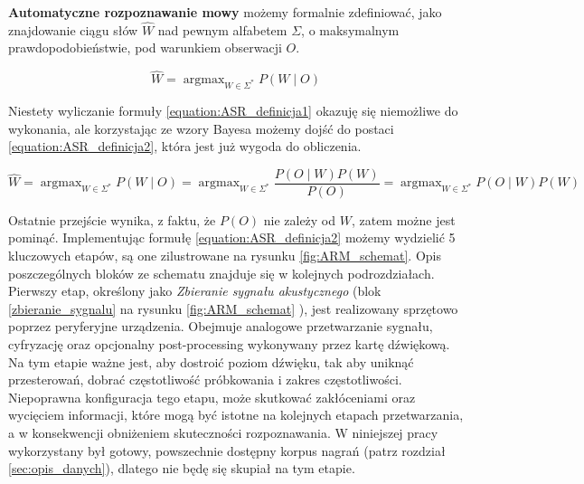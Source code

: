 \documentclass[shortabstract, mgr]{iithesis}
\DeclareMathOperator*{\argmax}{\arg\max}   %
\newcommand{\refBlock}[1]{
	\hyperref[#1]{\ref*{#1}}
}
\begin{document}
	\textbf{Automatyczne rozpoznawanie mowy} możemy formalnie zdefiniować, jako znajdowanie ciągu słów $\hat{W}$ nad pewnym alfabetem $\Sigma$, o maksymalnym prawdopodobieństwie, pod warunkiem obserwacji $O$.
	
	\begin{equation}
		\hat{W}=\argmax_{W \in \Sigma^{*}}{P(W \mid O)}
		\label{equation:ASR_definicja1}
	\end{equation}
	
	Niestety wyliczanie formuły \ref{equation:ASR_definicja1} okazuję się niemożliwe do wykonania, ale korzystając ze wzory Bayesa możemy dojść do postaci \ref{equation:ASR_definicja2}, która jest już wygoda do obliczenia.
	
	\begin{equation}
		\hat{W}=\argmax_{W \in \Sigma^{*}}{P(W \mid O)} = \argmax_{W \in \Sigma^{*}}{\frac{P(O \mid W)P(W)}{P(O)}} = \argmax_{W \in \Sigma^{*}}{P(O \mid W)P(W)}
		\label{equation:ASR_definicja2}
	\end{equation}
	
	Ostatnie przejście wynika, z faktu, że $P(O)$ nie zależy od $W$, zatem możne jest pominąć.
	Implementując formułę \ref{equation:ASR_definicja2} możemy wydzielić 5 kluczowych etapów, są one zilustrowane na rysunku \ref{fig:ARM_schemat}. Opis poszczególnych bloków ze schematu znajduje się w kolejnych podrozdziałach.
	\\
	Pierwszy etap, określony jako \textit{Zbieranie sygnału akustycznego} (blok \refBlock{zbieranie_sygnalu} na rysunku \ref{fig:ARM_schemat} ), jest realizowany sprzętowo poprzez peryferyjne urządzenia. Obejmuje analogowe przetwarzanie sygnału, cyfryzację oraz opcjonalny post-processing wykonywany przez kartę dźwiękową. Na tym etapie ważne jest, aby dostroić poziom dźwięku, tak aby uniknąć przesterowań, dobrać częstotliwość próbkowania i zakres częstotliwości. Niepoprawna konfiguracja tego etapu, może skutkować zakłóceniami oraz wycięciem informacji, które mogą być istotne na kolejnych etapach przetwarzania, a w konsekwencji obniżeniem skuteczności rozpoznawania. W niniejszej pracy wykorzystany był gotowy, powszechnie dostępny korpus nagrań (patrz rozdział \ref{sec:opis_danych}), dlatego nie będę się skupiał na tym etapie.
\end{document}
